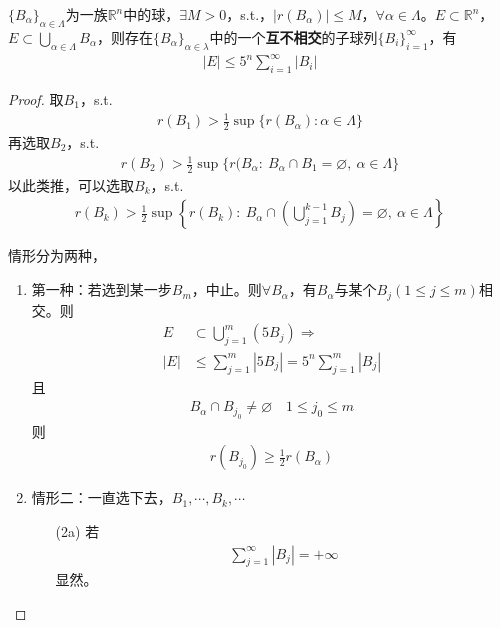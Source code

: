 \begin{theorem}[Vitali引理]\label{Th:Vitali}
    $\{B_{\alpha}\}_{\alpha\in\Lambda}$为一族$\mathbb{R}^n$中的球，$\exists M>0$，s.t.，$|r(B_{\alpha})| \leqslant M$，$\forall \alpha\in\Lambda$。$E\subset\mathbb{R}^n$，$E\subset \bigcup\limits_{\alpha\in\Lambda} B_{\alpha}$，则存在$\{B_{\alpha}\}_{\alpha\in\lambda}$中的一个\textbf{互不相交}的子球列$\{B_i\}_{i=1}^{\infty}$，有
    \begin{align*}
        |E| \leqslant 5^n \sum\limits_{i=1}^{\infty} |B_i|
    \end{align*}
\end{theorem}
\begin{proof}
    取$B_1$，s.t. 
    \begin{align*}
        r(B_1) > \frac{1}{2} \sup \{ r(B_{\alpha}) : \alpha\in \Lambda \}
    \end{align*}
    再选取$B_2$，s.t.
    \begin{align*}
        r(B_2) > \frac{1}{2} \sup \{r(B_{\alpha}:\ B_{\alpha} \cap B_1 = \varnothing,\ \alpha\in\Lambda \}
    \end{align*}
    以此类推，可以选取$B_k$，s.t.
    \begin{align*}
        r(B_k) > \frac{1}{2} \sup\left\lbrace r(B_k): \ B_{\alpha}\cap\left(\bigcup\limits_{j=1}^{k-1} B_j\right) = \varnothing,\ \alpha\in\Lambda\right\rbrace
    \end{align*}

    情形分为两种，
    \begin{enumerate}[leftmargin=1cm, label=\arabic*.]
    \item 第一种：若选到某一步$B_m$，中止。则$\forall B_{\alpha}$，有$B_{\alpha}$与某个$B_j(1\leqslant j\leqslant m)$相交。则
    \begin{align*}
        E &\subset \bigcup\limits_{j=1}^m (5B_j) \Rightarrow  \\
        |E| &\leqslant \sum\limits_{j=1}^m |5B_j| = 5^n \sum\limits_{j=1}^m |B_j|
    \end{align*}
    且
    \begin{align*}
        B_{\alpha} \cap B_{j_0} \neq \varnothing\quad 1\leqslant j_0\leqslant m
    \end{align*}
    则
    \begin{align*}
        r(B_{j_0}) \geqslant \frac{1}{2} r(B_{\alpha}) 
    \end{align*}

    \item 情形二：一直选下去，$B_1,\cdots,B_k,\cdots$
    \begin{enumerate}[leftmargin=1cm, label=(\arabic*.)]
        \item[(2a)] 若
        \begin{align*}
            \sum\limits_{j=1}^{\infty} |B_j| = +\infty
        \end{align*}
        显然。


\end{enumerate}
\end{enumerate}
\end{proof}
